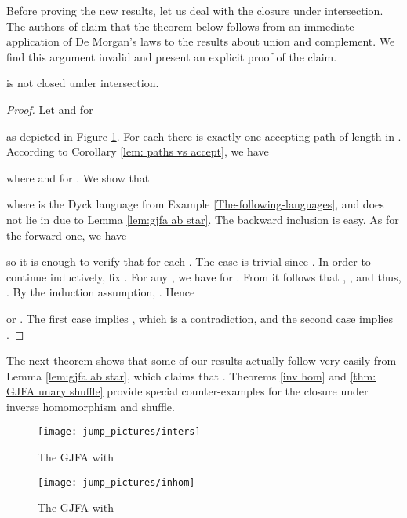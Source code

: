 \documentclass{ws-ijmpc}
\begin{document}
Before proving the new results, let us deal with the closure under
intersection. The authors of \citep{athMED1,athMED1book} claim that
the theorem below follows from an immediate application of De Morgan's
laws to the results about union and complement. We find this argument
invalid and present an explicit proof of the claim.
\begin{theorem}
\label{inters} is not closed under intersection.\end{theorem}
\begin{proof}
Let  and 
for 

as depicted in Figure \ref{fig:The-GJFA M inters}. For each 
there is exactly one accepting path of length  in . According
to Corollary \ref{lem: paths vs accept}, we have 

where  and 
for . We show that 

where  is the Dyck language from Example \ref{The-following-languages},
and  does not lie in\textbf{
} due to Lemma \ref{lem:gjfa ab star}. The backward
inclusion is easy. As for the forward one, we have 

so it is enough to verify that 
for each . The case  is trivial since .
In order to continue inductively, fix . For any ,
we have  for .
From  it follows that ,
, and thus, . By the induction
assumption, . Hence

or .
The first case implies , which is a contradiction, and
the second case implies . 
\end{proof}
The next theorem shows that some of our results actually follow very
easily from Lemma \ref{lem:gjfa ab star}, which claims that .
Theorems \ref{inv hom} and \ref{thm: GJFA unary shuffle} provide
special counter-examples for the closure under inverse homomorphism
and shuffle.
\begin{figure}
\begin{centering}
\texttt{[image: jump\_pictures/inters]}
\par\end{centering}

\caption{\label{fig:The-GJFA M inters}The GJFA  with }
\end{figure}
\begin{figure}
\begin{centering}
\texttt{[image: jump\_pictures/inhom]}
\par\end{centering}

\caption{\label{fig:The-GJFA M}The GJFA  with }
\end{figure}
\end{document}
